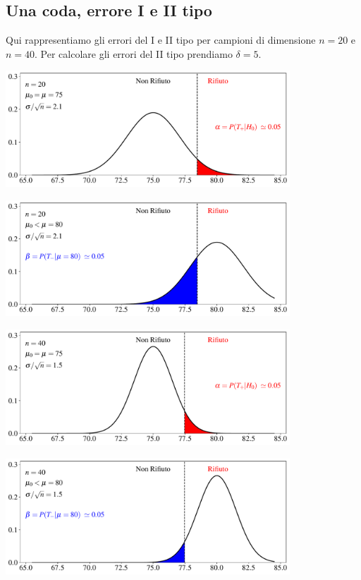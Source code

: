 \documentclass[11pt,openany]{book}
\begin{document}
\clearpage\subsection{Una coda, errore I e II tipo}

Qui rappresentiamo gli errori del I e II tipo per campioni di dimensione $n=20$ e $n= 40$. Per calcolare gli errori del II tipo prendiamo $\delta=5$.

\hfil\includegraphics[width=0.8\textwidth]{figure/Z-test_01.pdf}

\hfil\includegraphics[width=0.8\textwidth]{figure/Z-test_02.pdf}

\hfil\includegraphics[width=0.8\textwidth]{figure/Z-test_03.pdf}

\hfil\includegraphics[width=0.8\textwidth]{figure/Z-test_04.pdf}
\end{document}
